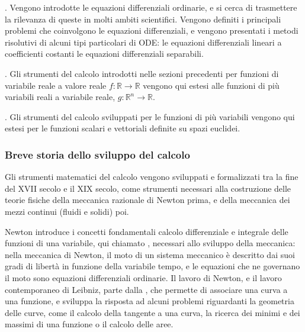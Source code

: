 \documentclass[letterpaper,10pt,italian]{jupyterBook}
\begin{document}
\sphinxAtStartPar
{\hyperref[\detokenize{ch/ode:ode-hs}]{}}. Vengono introdotte le equazioni differenziali ordinarie, e si cerca di trasmettere la rilevanza di queste in molti ambiti scientifici. Vengono definiti i principali problemi che coinvolgono le equazioni differenziali, e vengono presentati i metodi risolutivi di alcuni tipi particolari di ODE: le equazioni differenziali lineari a coefficienti costanti le equazioni differenziali separabili.

\sphinxAtStartPar
{\hyperref[\detokenize{ch/multivariable-calculus::doc}]{}}. Gli strumenti del calcolo introdotti nelle sezioni precedenti per funzioni di variabile reale a valore reale \(f: \mathbb{R} \rightarrow \mathbb{R}\) vengono qui estesi alle funzioni di più variabili reali a variabile reale, \(g: \mathbb{R}^n \rightarrow \mathbb{R}\).

\sphinxAtStartPar
{\hyperref[\detokenize{ch/vector-calculus::doc}]{}}. Gli strumenti del calcolo sviluppati per le funzioni di più variabili vengono qui estesi per le funzioni scalari e vettoriali definite su spazi euclidei.


\subsubsection*{Breve storia dello sviluppo del calcolo}

\sphinxAtStartPar
Gli strumenti matematici del calcolo vengono sviluppati e formalizzati tra la fine del XVII secolo e il XIX secolo, come strumenti necessari alla costruzione delle teorie fisiche della meccanica razionale di Newton prima, e della meccanica dei mezzi continui (fluidi e solidi) poi.

\sphinxAtStartPar
Newton introduce i concetti fondamentali calcolo differenziale e integrale delle funzioni di una variabile, qui chiamato {\hyperref[\detokenize{ch/infinitesimal_calculus/analysis:infinitesimal-calculus-analysis}]{}}, necessari allo sviluppo della meccanica: nella meccanica di Newton, il moto di un sistema meccanico è descritto dai suoi gradi di libertà in funzione della variabile tempo, e le equazioni che ne governano il moto sono equazioni differenziali ordinarie. Il lavoro di Newton, e il lavoro contemporaneo di Leibniz, parte dalla {\hyperref[\detokenize{ch/analytic_geometry:geometry-analytic}]{}}, che permette di associare una curva a una funzione, e sviluppa la risposta ad alcuni problemi riguardanti la geometria delle curve, come il calcolo della tangente a una curva, la ricerca dei minimi e dei massimi di una funzione o il calcolo delle aree.
\end{document}
